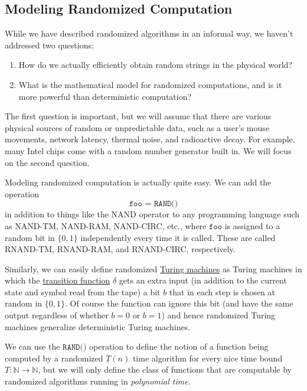   \subsection{Modeling Randomized Computation}

  While we have described randomized algorithms in an informal way, we haven't addressed two questions: 
  \begin{enumerate}
    \item How do we actually efficiently obtain random strings in the physical world? 
    \item What is the mathematical model for randomized computations, and is it more powerful than deterministic computation? 
  \end{enumerate}
  The first question is important, but we will assume that there are various physical sources of random or unpredictable data, such as a user's mouse movements, network latency, thermal noise, and radioactive decay. For example, many Intel chips come with a random number generator built in. We will focus on the second question. 

  Modeling randomized computation is actually quite easy. We can add the operation
  \begin{equation}
    \texttt{foo = RAND()}
  \end{equation}
  in addition to things like the NAND operator to any programming language such as NAND-TM, NAND-RAM, NAND-CIRC, etc., where $\texttt{foo}$ is assigned to a random bit in $\{0,1\}$ independently every time it is called. These are called RNAND-TM, RNAND-RAM, and RNAND-CIRC, respectively. 

  Similarly, we can easily define randomized \hyperref[def:turing-machine]{Turing machines} as Turing machines in which the \hyperref[sm-def:transition-function]{transition function} $\delta$ gets an extra input (in addition to the current state and symbol read from the tape) a bit $b$ that in each step is chosen at random in $\{0, 1\}$. Of course the function can ignore this bit (and have the same output regardless of whether $b = 0$ or $b= 1$) and hence randomized Turing machines generalize deterministic Turing machines. 

  We can use the $\texttt{RAND()}$ operation to define the notion of a function being computed by a randomized $T(n)$ time algorithm for every nice time bound $T: \mathbb{N} \to \mathbb{N}$, but we will only define the class of functions that are computable by randomized algorithms running in \textit{polynomial time}. 

